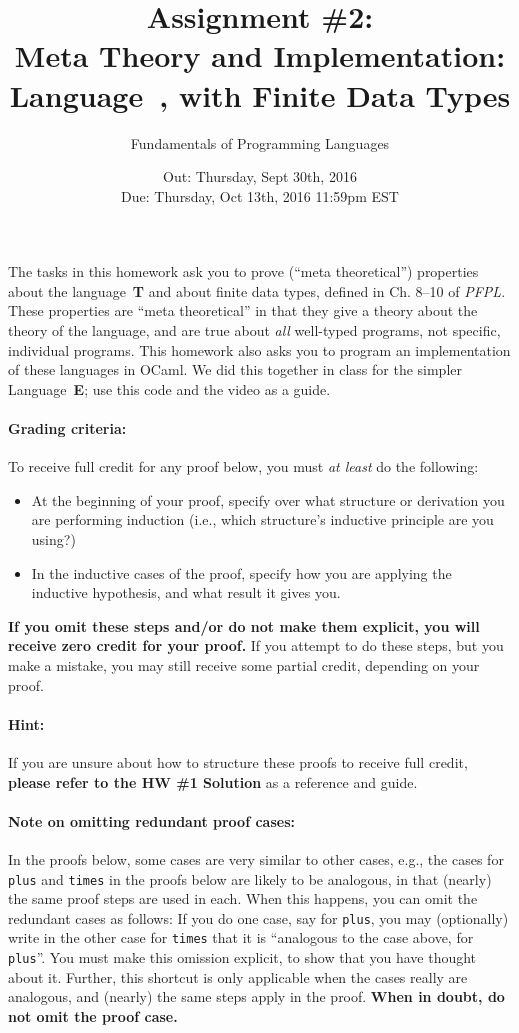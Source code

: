 \documentclass[11pt]{article}
\title{Assignment \#2: \\
  Meta Theory and Implementation:
  \\Language~\T, with Finite Data Types}
\author{Fundamentals of Programming Languages}
\date{Out: Thursday, Sept 30th, 2016\\
      Due: Thursday, Oct 13th, 2016 11:59pm EST}
\newcommand{\E}{\textbf{\textsf{E}}\xspace}
\newcommand{\T}{\textbf{\textsf{T}}\xspace}
\begin{document}
\maketitle

The tasks in this homework ask you to prove (``meta theoretical'')
properties about the language~\T and about finite data types, defined
in Ch. 8--10 of \emph{PFPL}.  These properties are ``meta
theoretical'' in that they give a theory about the theory of the
language, and are true about \emph{all} well-typed programs, not
specific, individual programs.
%
This homework also asks you to program an implementation of these
languages in OCaml.
%
We did this together in class for the simpler Language~\E; use this
code and the video as a guide.

\paragraph{Grading criteria:} To receive full credit for any proof below, you must \emph{at least} do the following:
\begin{itemize}
\item At the beginning of your proof, specify over what structure or derivation you are performing induction (i.e., which structure's inductive principle are you using?)
\item In the inductive cases of the proof, specify how you are applying the inductive hypothesis, and what result it gives you.
\end{itemize}
\textbf{If you omit these steps and/or do not make them explicit, you
  will receive zero credit for your proof.}  If you attempt to do
these steps, but you make a mistake, you may still receive some partial credit, depending on your proof.

\paragraph{Hint:}
If you are unsure about how to structure these proofs to receive full credit, 
\textbf{please refer to the HW \#1 Solution} as a reference and guide.

\paragraph{Note on omitting redundant proof cases:} In the proofs below, some cases are very
similar to other cases, e.g., the cases for \texttt{plus} and
\texttt{times} in the proofs below are likely to be analogous, in that
(nearly) the same proof steps are used in each.
%
When this happens, you can omit the redundant cases as follows: If you
do one case, say for \texttt{plus}, you may (optionally) write in the
other case for \texttt{times} that it is ``analogous to the case
above, for \texttt{plus}''.  You must make this omission explicit, to
show that you have thought about it.  Further, this shortcut is only
applicable when the cases really are analogous, and (nearly) the same
steps apply in the proof.  \textbf{When in doubt, do not omit the
  proof case.}
\end{document}
